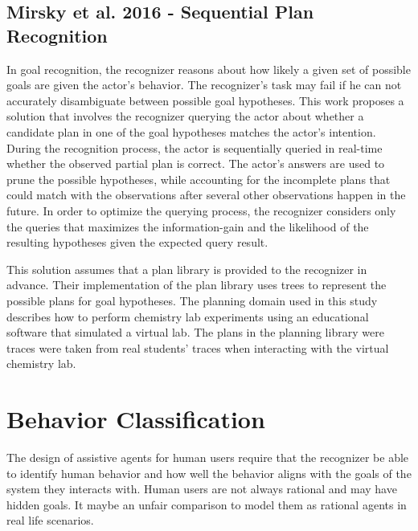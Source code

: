 \subsection{Mirsky et al. 2016 - Sequential Plan Recognition}
In goal recognition, the recognizer reasons about how likely a given set of possible goals are given the actor's behavior. The recognizer's task may fail if he can not accurately disambiguate between possible goal hypotheses. This work proposes a solution that involves the recognizer querying the actor about whether a candidate plan in one of the goal hypotheses matches the actor's intention. During the recognition process, the actor is sequentially queried in real-time whether the observed partial plan is correct. The actor's answers are used to prune the possible hypotheses, while accounting for the incomplete plans that could match with the observations after several other observations happen in the future. In order to optimize the querying process, the recognizer considers only the queries that maximizes the information-gain and the likelihood of the resulting hypotheses given the expected query result.

This solution assumes that a plan library is provided to the recognizer in advance. Their implementation of the plan library uses trees to represent the possible plans for goal hypotheses. The planning domain used in this study describes how to perform chemistry lab experiments  using an educational software that simulated a virtual lab. The plans in the planning library were traces were taken from real students' traces when interacting with the virtual chemistry lab.


\section{Behavior Classification}
The design of assistive agents for human users require that the recognizer be able to identify human behavior and how well the  behavior aligns with the goals of the system they interacts with. Human users are not always rational and may have hidden goals. It maybe an unfair comparison to model them as rational agents in real life scenarios.
 
